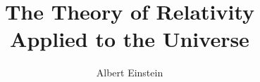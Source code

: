 \documentclass[12pt]{uthesis-v12}  %
\begin{document}


\title{The Theory of Relativity
       \protect\\ Applied to the Universe}

\author{Albert Einstein}



\end{document}
